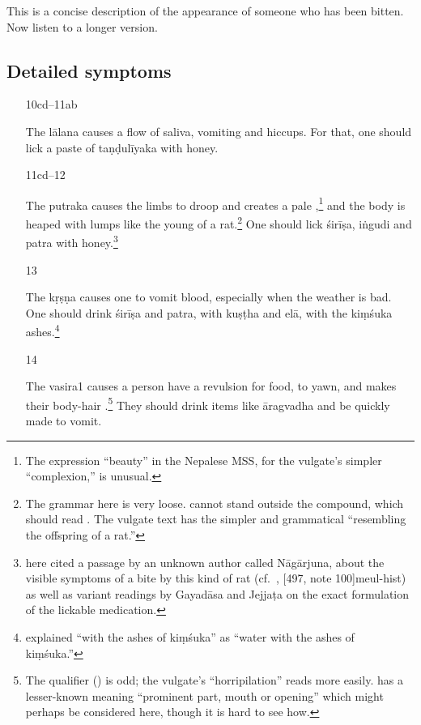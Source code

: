 \begin{translation}
This is a concise description of the appearance of someone who has been 
bitten.  Now listen to a longer version. 

\subsection{Detailed symptoms}

\begin{itemize}
\item[10cd--11ab]

The \Gls{lālana} causes a flow of saliva, vomiting and hiccups.  For that, one 
should lick a paste of \gls{taṇḍulīyaka} with honey. 

\item [11cd--12]

The \Gls{putraka} causes the limbs to droop and creates a pale
,\footnote{The expression  “beauty” in the
    Nepalese MSS, for the vulgate's simpler  “complexion,” is
    unusual.} and the body is heaped with lumps like the young of a
    rat.\footnote{The grammar here is very loose.  cannot
        stand outside the compound, which should read
        .  The vulgate text has the simpler and
        grammatical  “resembling the offspring of a
        rat.”}  One should lick \gls{śirīṣa}, \gls{iṅgudi} and \gls{patra}
        with honey.\footnote{ here cited a passage 
        by
            an unknown author called Nāgārjuna, about the visible symptoms of a
            bite by this kind of rat (cf.\ \cite[45--46]{shar-1982},
            [497, note 100]{meul-hist}) as well as variant readings
            by Gayadāsa and Jejjaṭa on the exact formulation of the lickable
            medication.}

\item [13]

The \Gls{kṛṣṇa} causes one to vomit blood, especially when the
weather is bad.  One should drink \gls{śirīṣa} and \gls{patra},  
with \gls{kuṣṭha} and \gls{elā}, with the 
\gls{kiṃśuka} ashes.\footnote{ explained “with the 
ashes of \gls{kiṃśuka}” as “water with the ashes of \gls{kiṃśuka}.”}

\item [14]

The \Gls{vasira1} causes a person have a revulsion for food, to yawn,
and makes their body-hair .\footnote{The qualifier
     () is odd; the vulgate's 
    “horripilation” reads more easily.  has a lesser-known
    meaning “prominent part, mouth or opening” which might perhaps be
    considered here, though it is hard to see how.}  They should drink
    items like \gls{āragvadha} and be quickly made to vomit.


\end{itemize}
\end{translation}

